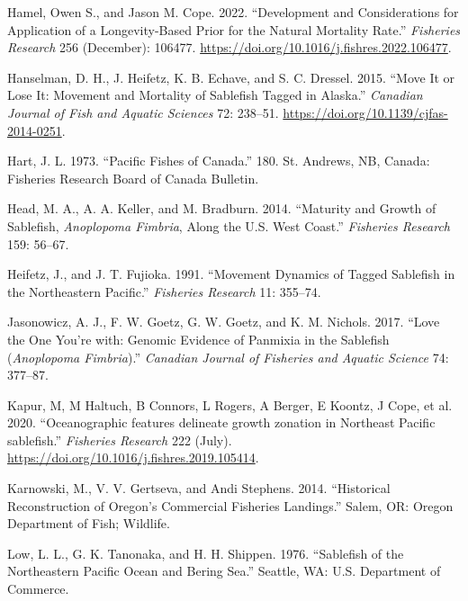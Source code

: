 \documentclass[
]{scrartcl}
\newlength{\cslhangindent}
\newenvironment{CSLReferences}[2] %
 {\begin{list}{}{%
  \setlength{\itemindent}{0pt}
  \setlength{\leftmargin}{0pt}
  \setlength{\parsep}{0pt}
  \ifodd #1
   \setlength{\leftmargin}{\cslhangindent}
   \setlength{\itemindent}{-1\cslhangindent}
  \fi
  \setlength{\itemsep}{#2\baselineskip}}}
 {\end{list}}
\begin{document}
\begin{CSLReferences}{1}{0}
Hamel, Owen S., and Jason M. Cope. 2022. {``Development and
Considerations for Application of a Longevity-Based Prior for the
Natural Mortality Rate.''} \emph{Fisheries Research} 256 (December):
106477. \url{https://doi.org/10.1016/j.fishres.2022.106477}.

Hanselman, D. H., J. Heifetz, K. B. Echave, and S. C. Dressel. 2015.
{``Move It or Lose It: Movement and Mortality of Sablefish Tagged in
{A}laska.''} \emph{Canadian Journal of Fish and Aquatic Sciences} 72:
238--51. \url{https://doi.org/10.1139/cjfas-2014-0251}.

Hart, J. L. 1973. {``Pacific Fishes of {C}anada.''} 180. St. Andrews,
NB, Canada: Fisheries Research Board of Canada Bulletin.

Head, M. A., A. A. Keller, and M. Bradburn. 2014. {``Maturity and Growth
of Sablefish, \emph{{A}noplopoma Fimbria}, Along the {U.S.} {W}est
{C}oast.''} \emph{Fisheries Research} 159: 56--67.

Heifetz, J., and J. T. Fujioka. 1991. {``Movement Dynamics of Tagged
Sablefish in the Northeastern {P}acific.''} \emph{Fisheries Research}
11: 355--74.

Jasonowicz, A. J., F. W. Goetz, G. W. Goetz, and K. M. Nichols. 2017.
{``Love the One You're with: Genomic Evidence of Panmixia in the
Sablefish (\emph{{A}noplopoma Fimbria}).''} \emph{Canadian Journal of
Fisheries and Aquatic Science} 74: 377--87.

Kapur, M, M Haltuch, B Connors, L Rogers, A Berger, E Koontz, J Cope, et
al. 2020. {``{Oceanographic features delineate growth zonation in
Northeast Pacific sablefish}.''} \emph{Fisheries Research} 222 (July).
\url{https://doi.org/10.1016/j.fishres.2019.105414}.

Karnowski, M., V. V. Gertseva, and Andi Stephens. 2014. {``Historical
{Reconstruction} of {Oregon}'s {Commercial} {Fisheries} {Landings}.''}
Salem, OR: Oregon Department of Fish; Wildlife.

Low, L. L., G. K. Tanonaka, and H. H. Shippen. 1976. {``Sablefish of the
{N}ortheastern {P}acific {O}cean and {B}ering {S}ea.''} Seattle, WA:
{U}.{S}. Department of Commerce.


\end{CSLReferences}
\end{document}
